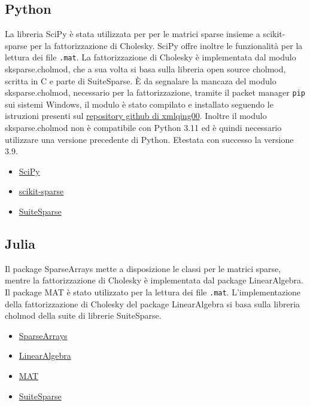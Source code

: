 \documentclass[a4paper, 12pt]{article}
\begin{document}
\subsection{Python}
La libreria SciPy è stata utilizzata per per le matrici sparse insieme a
scikit-sparse per la fattorizzazione di Cholesky.
SciPy offre inoltre le funzionalità per la lettura dei file \texttt{.mat}.
La fattorizzazione di Cholesky è implementata dal modulo sksparse.cholmod,
che a sua volta si basa sulla libreria open source cholmod, scritta in C e
parte di SuiteSparse.
\`E da segnalare la mancaza del modulo sksparse.cholmod, necessario per la
fattorizzazione, tramite il packet manager \texttt{pip} sui sistemi Windows,
il modulo è stato compilato e installato seguendo le istruzioni presenti sul
\href{https://github.com/xmlyqing00/Cholmod-Scikit-Sparse-Windows}
{repository github di xmlqing00}.
Inoltre il modulo sksparse.cholmod non è compatibile con Python 3.11
ed è quindi necessario utilizzare una versione precedente di Python.
E\` testata con successo la versione 3.9.

\begin{itemize}
\item \href{https://www.scipy.org/}{SciPy}
\item \href{https://github.com/scikit-sparse/scikit-sparse} {scikit-sparse}
\item \href{http://suitesparse.com}{SuiteSparse}
\end{itemize}

\subsection{Julia}
Il package SparseArrays mette a disposizione le classi per le matrici sparse,
mentre la fattorizzazione di Cholesky è implementata dal package LinearAlgebra.
Il package MAT è stato utilizzato per la lettura dei file \texttt{.mat}.
L'implementazione della fattorizzazione di Cholesky del package LinearAlgebra
si basa sulla libreria cholmod della suite di librerie SuiteSparse.

\begin{itemize}
\item \href{https://docs.julialang.org/en/v1/stdlib/SparseArrays/}{SparseArrays}
\item \href{https://docs.julialang.org/en/v1/stdlib/LinearAlgebra/}
{LinearAlgebra}
\item \href{https://github.com/JuliaIO/MAT.jl}{MAT}
\item \href{http://suitesparse.com}{SuiteSparse}
\end{itemize}
\end{document}
